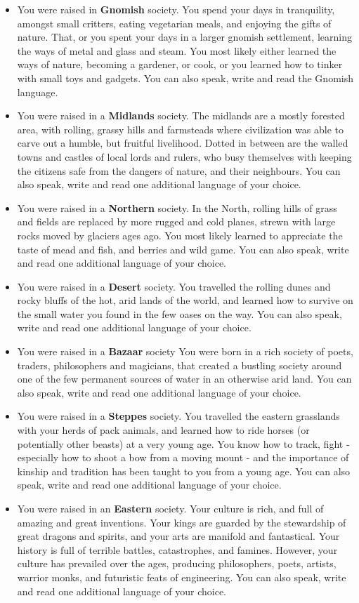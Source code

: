 \begin{itemize}
    \item You were raised in \textbf{Gnomish} society.
    You spend your days in tranquility, amongst small critters, eating vegetarian meals, and enjoying the gifts of nature.
    That, or you spent your days in a larger gnomish settlement, learning the ways of metal and glass and steam.
    You most likely either learned the ways of nature, becoming a gardener, or cook, or you learned how to tinker with small toys and gadgets.
    You can also speak, write and read the Gnomish language.
    \item You were raised in a \textbf{Midlands} society.
    The midlands are a mostly forested area, with rolling, grassy hills and farmsteads where civilization was able to carve out a humble, but fruitful livelihood.
    Dotted in between are the walled towns and castles of local lords and rulers, who busy themselves with keeping the citizens safe from the dangers of nature, and their neighbours.
    You can also speak, write and read one additional language of your choice.
    \item You were raised in a \textbf{Northern} society.
    In the North, rolling hills of grass and fields are replaced by more rugged and cold planes, strewn with large rocks moved by glaciers ages ago.
    You most likely learned to appreciate the taste of mead and fish, and berries and wild game.
    You can also speak, write and read one additional language of your choice.
    \item You were raised in a \textbf{Desert} society.
    You travelled the rolling dunes and rocky bluffs of the hot, arid lands of the world, and learned how to survive on the small water you found in the few oases on the way.
    You can also speak, write and read one additional language of your choice.
    \item You were raised in a \textbf{Bazaar} society
    You were born in a rich society of poets, traders, philosophers and magicians, that created a bustling society around one of the few permanent sources of water in an otherwise arid land.
    You can also speak, write and read one additional language of your choice.
    \item You were raised in a \textbf{Steppes} society.
    You travelled the eastern grasslands with your herds of pack animals, and learned how to ride horses (or potentially other beasts) at a very young age.
    You know how to track, fight - especially how to shoot a bow from a moving mount - and the importance of kinship and tradition has been taught to you from a young age.
    You can also speak, write and read one additional language of your choice.
    \item You were raised in an \textbf{Eastern} society.
    Your culture is rich, and full of amazing and great inventions.
    Your kings are guarded by the stewardship of great dragons and spirits, and your arts are manifold and fantastical.
    Your history is full of terrible battles, catastrophes, and famines.
    However, your culture has prevailed over the ages, producing philosophers, poets, artists, warrior monks, and futuristic feats of engineering.
    You can also speak, write and read one additional language of your choice.
\end{itemize}